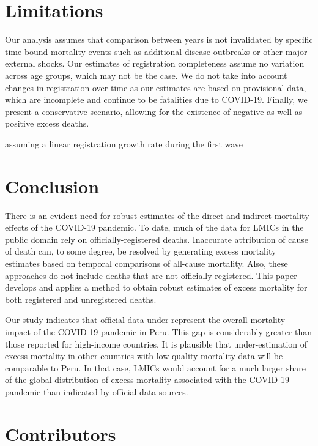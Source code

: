 \documentclass[
]{article}
\begin{document}
\hypertarget{limitations}{%
\section{Limitations}\label{limitations}}

Our analysis assumes that comparison between years is not invalidated by specific time-bound mortality events such as additional disease outbreaks or other major external shocks. Our estimates of registration completeness assume no variation across age groups, which may not be the case. We do not take into account changes in registration over time as our estimates are based on provisional data, which are incomplete and continue to be fatalities due to COVID-19. Finally, we present a conservative scenario, allowing for the existence of negative as well as positive excess deaths.

assuming a linear registration growth rate during the first wave

\hypertarget{conclusion}{%
\section{Conclusion}\label{conclusion}}

There is an evident need for robust estimates of the direct and indirect mortality effects of the COVID-19 pandemic. To date, much of the data for LMICs in the public domain rely on officially-registered deaths. Inaccurate attribution of cause of death can, to some degree, be resolved by generating excess mortality estimates based on temporal comparisons of all-cause mortality. Also, these approaches do not include deaths that are not officially registered. This paper develops and applies a method to obtain robust estimates of excess mortality for both registered and unregistered deaths.

Our study indicates that official data under-represent the overall mortality impact of the COVID-19 pandemic in Peru. This gap is considerably greater than those reported for high-income countries. It is plausible that under-estimation of excess mortality in other countries with low quality mortality data will be comparable to Peru. In that case, LMICs would account for a much larger share of the global distribution of excess mortality associated with the COVID-19 pandemic than indicated by official data sources.

\hypertarget{contributors}{%
\section{Contributors}\label{contributors}}
\end{document}
